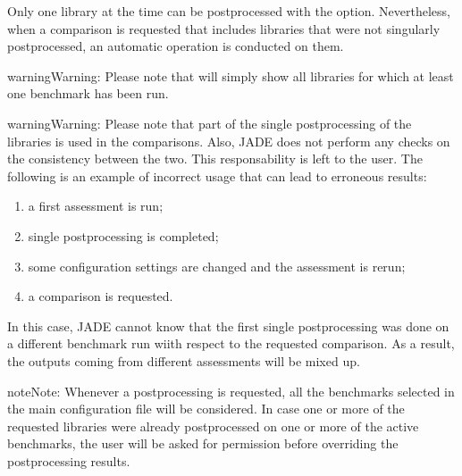 \documentclass[letterpaper,10pt,english]{sphinxmanual}
\begin{document}
Only one library at the time can be post\sphinxhyphen{}processed with the  option. Nevertheless, when a comparison is requested that
includes libraries that were not singularly post\sphinxhyphen{}processed, an automatic  operation is conducted on them.

\begin{sphinxadmonition}{warning}{Warning:}
Please note that  will simply show all libraries for which at least one benchmark has been run.
\end{sphinxadmonition}

\begin{sphinxadmonition}{warning}{Warning:}
Please note that part of the single post\sphinxhyphen{}processing of the libraries is used in the comparisons. Also, JADE does not perform
any checks on the consistency between the two. This responsability is left to the user.
The following is an example of incorrect usage that can lead to erroneous results:
\begin{enumerate}
%
\item {} 
a first assessment is run;

\item {} 
single post\sphinxhyphen{}processing is completed;

\item {} 
some configuration settings are changed and the assessment is re\sphinxhyphen{}run;

\item {} 
a comparison is requested.

\end{enumerate}

In this case, JADE cannot know that the first single post\sphinxhyphen{}processing was done on a different benchmark run wiith respect
to the requested comparison. As a result, the outputs coming from different assessments will be mixed up.
\end{sphinxadmonition}

\begin{sphinxadmonition}{note}{Note:}
Whenever a post\sphinxhyphen{}processing is requested, all the benchmarks selected in the main configuration file will be considered.
In case one or more of the requested libraries were already post\sphinxhyphen{}processed on one or more of the active benchmarks,
the user will be asked for permission before overriding the post\sphinxhyphen{}processing results.
\end{sphinxadmonition}
\end{document}
